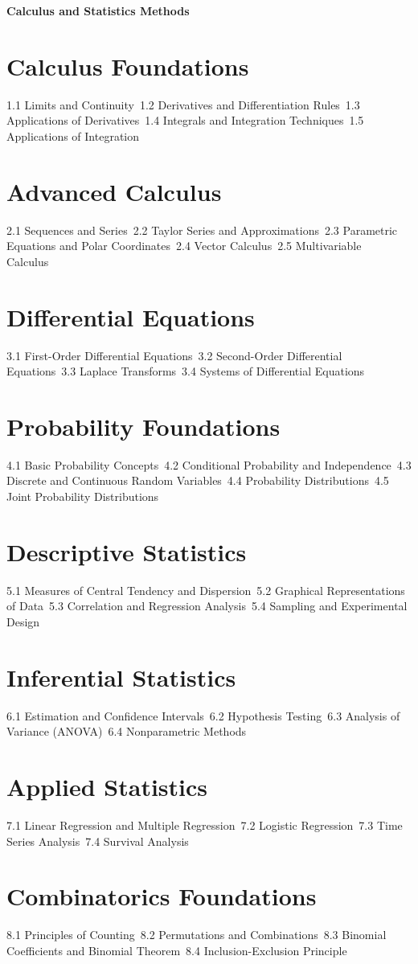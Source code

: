 {\LARGE \bf{Calculus and Statistics Methods}}
\section{Calculus Foundations}
1.1 Limits and Continuity\
1.2 Derivatives and Differentiation Rules\
1.3 Applications of Derivatives\
1.4 Integrals and Integration Techniques\
1.5 Applications of Integration\
\section{Advanced Calculus}
2.1 Sequences and Series\
2.2 Taylor Series and Approximations\
2.3 Parametric Equations and Polar Coordinates\
2.4 Vector Calculus\
2.5 Multivariable Calculus\
\section{Differential Equations}
3.1 First-Order Differential Equations\
3.2 Second-Order Differential Equations\
3.3 Laplace Transforms\
3.4 Systems of Differential Equations\
\section{Probability Foundations}
4.1 Basic Probability Concepts\
4.2 Conditional Probability and Independence\
4.3 Discrete and Continuous Random Variables\
4.4 Probability Distributions\
4.5 Joint Probability Distributions\
\section{Descriptive Statistics}
5.1 Measures of Central Tendency and Dispersion\
5.2 Graphical Representations of Data\
5.3 Correlation and Regression Analysis\
5.4 Sampling and Experimental Design\
\section{Inferential Statistics}
6.1 Estimation and Confidence Intervals\
6.2 Hypothesis Testing\
6.3 Analysis of Variance (ANOVA)\
6.4 Nonparametric Methods\
\section{Applied Statistics}
7.1 Linear Regression and Multiple Regression\
7.2 Logistic Regression\
7.3 Time Series Analysis\
7.4 Survival Analysis\
\section{Combinatorics Foundations}
8.1 Principles of Counting\
8.2 Permutations and Combinations\
8.3 Binomial Coefficients and Binomial Theorem\
8.4 Inclusion-Exclusion Principle\
